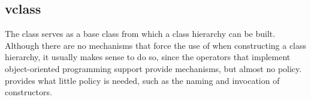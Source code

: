 %
%
%
%
%

\subsection{vclass}
\label{sec:vclass}

The  class serves as a base class from which a class hierarchy
can be built.  Although there are no mechanisms that force the use of
 when constructing a class hierarchy, it usually makes sense to
do so, since the operators that implement object-oriented programming support
provide mechanisms, but almost no policy.   provides what
little policy is needed, such as the naming and invocation of constructors.

